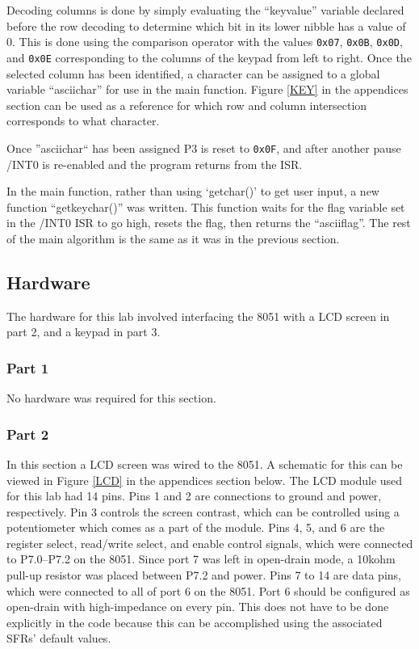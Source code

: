 \documentclass[12pt]{article}
\begin{document}
Decoding columns is done by simply evaluating the ``keyvalue'' variable declared before the row decoding to determine which bit in its lower nibble has a value of 0. This is done using the comparison operator with the values \texttt{0x07}, \texttt{0x0B}, \texttt{0x0D}, and \texttt{0x0E} corresponding to the columns of the keypad from left to right. Once the selected column has been identified, a character can be assigned to a global variable ``asciichar'' for use in the main function. Figure \ref{KEY} in the appendices section can be used as a reference for which row and column intersection corresponds to what character. 

Once ''asciichar`` has been assigned P3 is reset to \texttt{0x0F}, and after another pause /INT0 is re-enabled and the program returns from the ISR.  

In the main function, rather than using `getchar()' to get user input, a new function ``getkeychar()'' was written. This function waits for the flag variable set in the /INT0 ISR to go high, resets the flag, then returns the ``asciiflag''. The rest of the main algorithm is the same as it was in the previous section.  

\subsection{Hardware}
The hardware for this lab involved interfacing the 8051 with a LCD screen in part 2, and a keypad in part 3.

\subsubsection{Part 1}
No hardware was required for this section.

\subsubsection{Part 2}
In this section a LCD screen was wired to the 8051. A schematic for this can be viewed in Figure \ref{LCD} in the appendices section below. The LCD module used for this lab had 14 pins.
Pins 1 and 2 are connections to ground and power, respectively. Pin 3 controls the screen contrast, which can be controlled using a potentiometer which comes as a part of the module. Pins 4, 5, and 6 are the register select, read/write select, and enable control signals, which were connected to P7.0--P7.2 on the 8051. Since port 7 was left in open-drain mode, a 10k\si{ohm} pull-up resistor was placed between P7.2 and power. Pins 7 to 14 are data pins, which were connected to all of port 6 on the 8051. Port 6 should be configured as open-drain with high-impedance on every pin. This does not have to be done explicitly in the code because this can be accomplished using the associated SFRs' default values.
\end{document}
